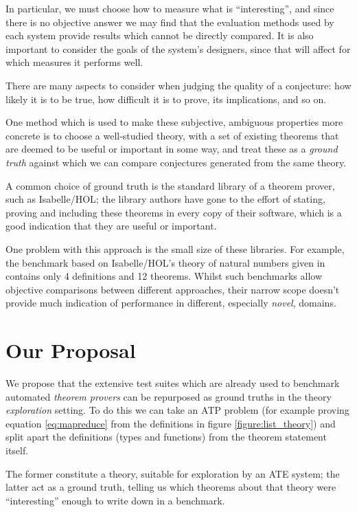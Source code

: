 In particular, we must choose how to measure what is ``interesting'', and since
there is no objective answer we may find that the evaluation methods used by
each system provide results which cannot be directly compared. It is also
important to consider the goals of the system's designers, since that will
affect for which measures it performs well.

There are many aspects to consider when judging the quality of a conjecture: how
likely it is to be true, how difficult it is to prove, its implications, and so
on.

One method which is used to make these subjective, ambiguous properties more
concrete is to choose a well-studied theory, with a set of existing theorems that
are deemed to be useful or important in some way, and treat these as a
\emph{ground truth} against which we can compare conjectures generated from the
same theory.

A common choice of ground truth is the standard library of a theorem prover,
such as Isabelle/HOL; the library authors have gone to the effort of stating,
proving and including these theorems in every copy of their software, which is a
good indication that they are useful or important.

One problem with this approach is the small size of these libraries. For
example, the benchmark based on Isabelle/HOL's theory of natural numbers given
in~\cite{Johansson.Dixon.Bundy:conjecture-generation} contains
only 4 definitions and 12 theorems. Whilst such benchmarks allow objective
comparisons between different approaches, their narrow scope doesn't provide
much indication of performance in different, especially \emph{novel}, domains.

\section{Our Proposal} %
\label{sec:proposal}

We propose that the extensive test suites which are already used to benchmark
automated \emph{theorem provers} can be repurposed as ground truths in the
theory \emph{exploration} setting. To do this we can take an ATP problem (for
example proving equation \ref{eq:mapreduce} from the definitions in figure
\ref{figure:list_theory}) and split apart the definitions (types and functions)
from the theorem statement itself.

The former constitute a theory, suitable for exploration by an ATE system; the
latter act as a ground truth, telling us which theorems about that theory were
``interesting'' enough to write down in a benchmark.

